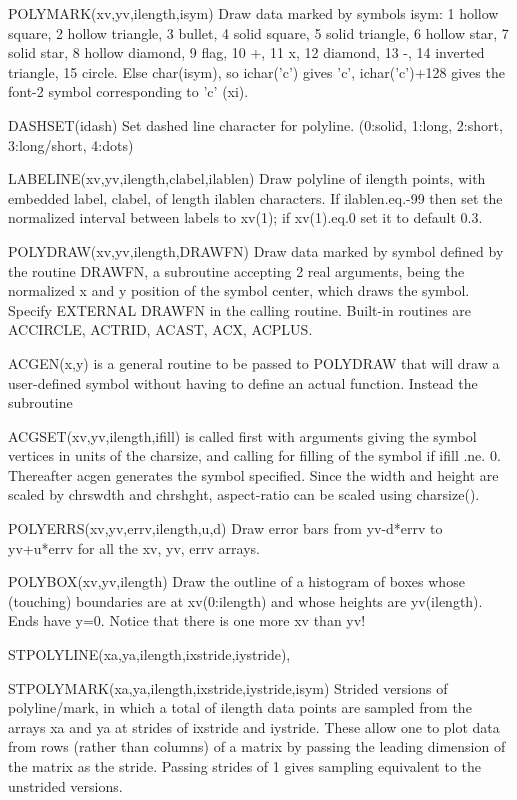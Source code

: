 \documentclass[12pt]{article}
\begin{document}
POLYMARK(xv,yv,ilength,isym) Draw data marked by symbols isym:
1 hollow square, 2 hollow triangle, 3 bullet, 4 solid square, 5 solid 
triangle, 6 hollow star, 7 solid star, 8 hollow diamond, 9 flag, 10 +,
11 x, 12 diamond, 13 -, 14 inverted triangle, 15 circle. Else
char(isym), so ichar('c') gives 'c', ichar('c')+128 gives the font-2
symbol corresponding to 'c' (xi).

DASHSET(idash) Set dashed line character for polyline. 
(0:solid, 1:long, 2:short, 3:long/short, 4:dots)

LABELINE(xv,yv,ilength,clabel,ilablen) Draw polyline of ilength
points, with embedded label, clabel, of length ilablen characters. If
ilablen.eq.-99 then set the normalized interval between labels to
xv(1); if xv(1).eq.0 set it to default 0.3.

POLYDRAW(xv,yv,ilength,DRAWFN) Draw data marked by symbol defined by
the routine DRAWFN, a subroutine accepting 2 real arguments, being the
normalized x and y position of the symbol center, which draws the symbol.
Specify EXTERNAL DRAWFN in the calling routine. Built-in routines are
ACCIRCLE, ACTRID, ACAST, ACX, ACPLUS.

ACGEN(x,y) is a general routine to be passed to POLYDRAW that will draw a
user-defined symbol without having to define an actual
function. Instead the subroutine 

ACGSET(xv,yv,ilength,ifill) is called
first with arguments giving the symbol vertices in units of the
charsize, and calling for filling of the symbol if ifill .ne. 0.
Thereafter acgen generates the symbol specified. Since the width and
height are scaled by chrswdth and chrshght, aspect-ratio can be scaled
using charsize().

POLYERRS(xv,yv,errv,ilength,u,d) Draw error bars from yv-d*errv to
yv+u*errv for all the xv, yv, errv arrays.

POLYBOX(xv,yv,ilength) Draw the outline of a histogram of boxes whose
(touching) boundaries are at xv(0:ilength) and whose heights are
yv(ilength). Ends have y=0. Notice that there is one more xv than yv!

STPOLYLINE(xa,ya,ilength,ixstride,iystride),

STPOLYMARK(xa,ya,ilength,ixstride,iystride,isym) Strided versions of
polyline/mark, in which a total of ilength data points are sampled
from the arrays xa and ya at strides of ixstride and iystride. These
allow one to plot data from rows (rather than columns) of a matrix by
passing the leading dimension of the matrix as the stride. Passing
strides of 1 gives sampling equivalent to the unstrided versions.
\end{document}
